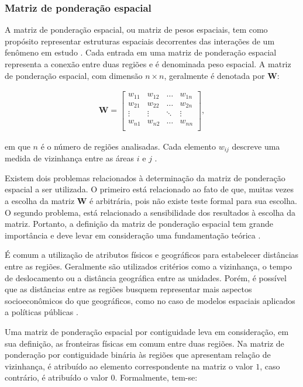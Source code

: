 \documentclass[12pt,a4paper]{article}
\begin{document}
\subsubsection{Matriz de ponderação espacial} \label{W_matrix_2}
	
A matriz de ponderação espacial, ou matriz de pesos espaciais, tem como propósito representar estruturas espaciais decorrentes das interações de um fenômeno em estudo \cite{almeida12_g}.
Cada entrada em uma matriz de ponderação espacial representa a conexão entre duas regiões e é denominada peso espacial. A matriz de ponderação espacial, com dimensão $n \times n$, geralmente é denotada por $\boldsymbol{W}$: 
	
\begin{align*}
	\boldsymbol{W} =
    \left[
    \begin{array}{cccc}
        w_{11} & w_{12} & \dots & w_{1n} \\
        w_{21} & w_{22} & \dots &w_{2n} \\
        \vdots & \vdots & \ddots & \vdots \\
        w_{n1} & w_{n2} & \dots & w_{nn}\\
    \end{array}
    \right],
\end{align*}
	
\noindent em que $n$ é o número de regiões analisadas. Cada elemento $w_{ij}$ descreve uma medida de vizinhança entre as áreas $i$ e $j$ \cite{camara04_g}.
	
Existem dois problemas relacionados à determinação da matriz de ponderação espacial a ser utilizada. O primeiro está relacionado ao fato de que, muitas vezes a escolha da matriz $\boldsymbol{W}$ é arbitrária, pois não existe teste formal para sua escolha. O segundo problema, está relacionado a sensibilidade dos resultados à escolha da matriz. Portanto, a definição da matriz de ponderação espacial tem grande importância e deve levar em consideração uma fundamentação teórica \cite{almeida12_g}. 
	
É comum a utilização de atributos físicos e geográficos para estabelecer distâncias entre as regiões. Geralmente são utilizados critérios como a vizinhança, o tempo de deslocamento  ou a distância geográfica entre as unidades. Porém, é possível que as distâncias entre as regiões busquem representar mais aspectos socioeconômicos do que geográficos, como no caso de modelos espaciais aplicados a políticas públicas \cite{tyszler06_g}. 

Uma matriz de ponderação espacial por contiguidade leva em consideração, em sua definição, as fronteiras físicas em comum entre duas regiões. Na matriz de ponderação por contiguidade binária às regiões que apresentam relação de vizinhança, é atribuído ao elemento correspondente na matriz o valor $1$, caso contrário, é atribuído o valor $0$. Formalmente, tem-se:
	
\end{document}
